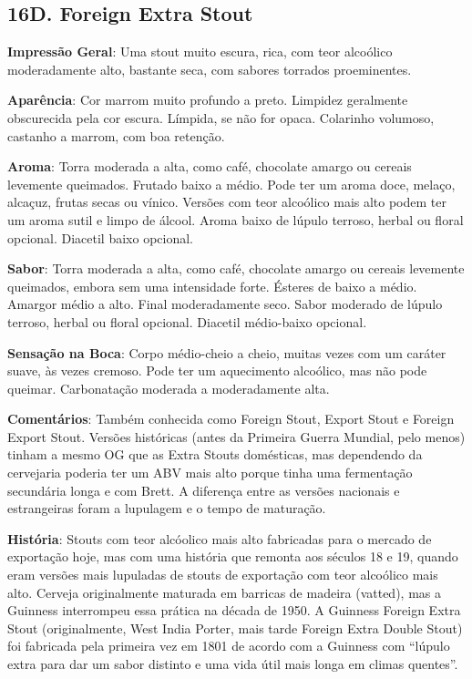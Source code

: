 \subsection*{16D. Foreign Extra Stout}
\textbf{Impressão Geral}: Uma stout muito escura, rica, com teor alcoólico moderadamente alto, bastante seca, com sabores torrados proeminentes.

\textbf{Aparência}: Cor marrom muito profundo a preto. Limpidez geralmente obscurecida pela cor escura. Límpida, se não for opaca. Colarinho volumoso, castanho a marrom, com boa retenção.

\textbf{Aroma}: Torra moderada a alta, como café, chocolate amargo ou cereais levemente queimados. Frutado baixo a médio. Pode ter um aroma doce, melaço, alcaçuz, frutas secas ou vínico. Versões com teor alcoólico mais alto podem ter um aroma sutil e limpo de álcool. Aroma baixo de lúpulo terroso, herbal ou floral opcional. Diacetil baixo opcional.

\textbf{Sabor}: Torra moderada a alta, como café, chocolate amargo ou cereais levemente queimados, embora sem uma intensidade forte. Ésteres de baixo a médio. Amargor médio a alto. Final moderadamente seco. Sabor moderado de lúpulo terroso, herbal ou floral opcional. Diacetil médio-baixo opcional.

\textbf{Sensação na Boca}: Corpo médio-cheio a cheio, muitas vezes com um caráter suave, às vezes cremoso. Pode ter um aquecimento alcoólico, mas não pode queimar. Carbonatação moderada a moderadamente alta.

\textbf{Comentários}: Também conhecida como Foreign Stout, Export Stout e Foreign Export Stout. Versões históricas (antes da Primeira Guerra Mundial, pelo menos) tinham a mesmo OG que as Extra Stouts domésticas, mas dependendo da cervejaria poderia ter um ABV mais alto porque tinha uma fermentação secundária longa e com Brett. A diferença entre as versões nacionais e estrangeiras foram a lupulagem e o tempo de maturação.

\textbf{História}: Stouts com teor alcóolico mais alto fabricadas para o mercado de exportação hoje, mas com uma história que remonta aos séculos 18 e 19, quando eram versões mais lupuladas de stouts de exportação com teor alcoólico mais alto. Cerveja originalmente maturada em barricas de madeira (vatted), mas a Guinness interrompeu essa prática na década de 1950. A Guinness Foreign Extra Stout (originalmente, West India Porter, mais tarde Foreign Extra Double Stout) foi fabricada pela primeira vez em 1801 de acordo com a Guinness com “lúpulo extra para dar um sabor distinto e uma vida útil mais longa em climas quentes”.

